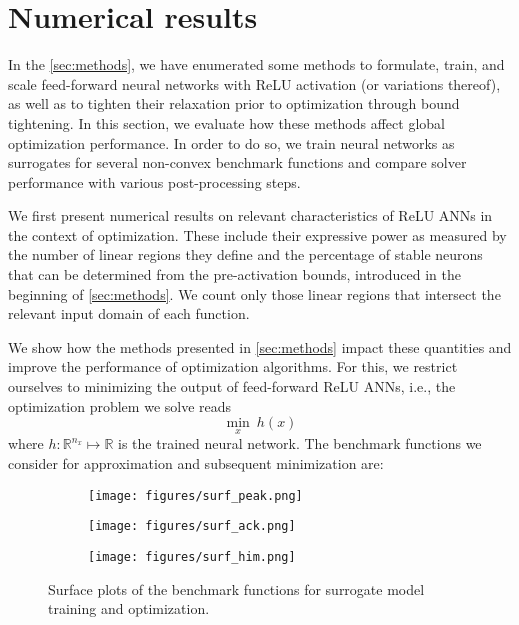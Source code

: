\section{Numerical results}\label{sec:results}

In the \cref{sec:methods}, we have enumerated some methods to formulate, train, and scale feed-forward neural networks with ReLU activation (or variations thereof), as well as to tighten their relaxation prior to optimization through bound tightening. In this section, we evaluate how these methods affect global optimization performance. In order to do so, we train neural networks as surrogates for several non-convex benchmark functions and compare solver performance with various post-processing steps.

We first present numerical results on relevant characteristics of ReLU ANNs in the context of optimization. These include their expressive power as measured by the number of linear regions they define and the percentage of stable neurons that can be determined from the pre-activation bounds, introduced in the beginning of \cref{sec:methods}.  We count only those linear regions that intersect the relevant input domain of each function.

We show how the methods presented in \cref{sec:methods} impact these quantities and improve the performance of optimization algorithms. For this, we restrict ourselves to minimizing the output of feed-forward ReLU ANNs, i.e., the optimization problem we solve reads
\begin{equation}\label{prob:minANN}
    \min_{x} \ h(x)
\end{equation}
where $h \colon \mathbb{R}^{{n_x}} \mapsto \mathbb{R}$ is the trained neural network. 
The benchmark functions we consider for approximation and subsequent minimization are:

\begin{figure}[t]
    \centering
    \begin{subfigure}{.32\linewidth}
        \texttt{[image: figures/surf\_peak.png]}
        \label{fig:peaks-function}
    \end{subfigure}
    \begin{subfigure}{.32\linewidth}
        \texttt{[image: figures/surf\_ack.png]}
        \label{fig:ack-function}
    \end{subfigure}
    \begin{subfigure}{.32\linewidth}
        \texttt{[image: figures/surf\_him.png]}
        \label{fig:him-function}
    \end{subfigure}
    \caption{Surface plots of the benchmark functions for surrogate model training and optimization.}
    \label{fig:different_functions}
\end{figure}


